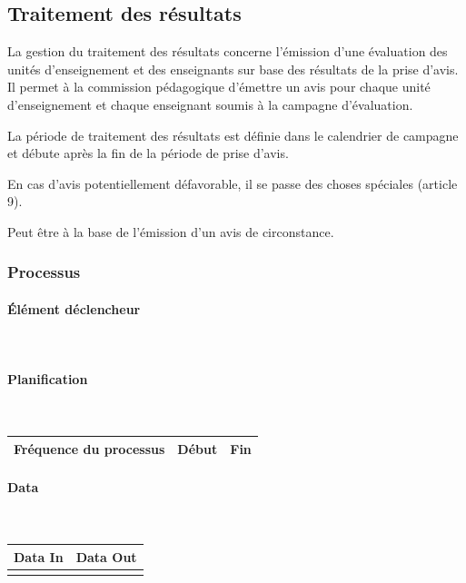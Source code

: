 \documentclass[a4paper,11pt]{report}
\begin{document}
\subsection{Traitement des résultats}
La gestion du traitement des résultats concerne l'émission d'une évaluation des unités d'enseignement et des enseignants sur base des résultats de la prise d'avis.
Il permet à la commission pédagogique d'émettre un avis pour chaque unité d'enseignement et chaque enseignant soumis à la campagne d'évaluation.

La période de traitement des résultats est définie dans le calendrier de campagne et débute après la fin de la période de prise d'avis.

En cas d'avis potentiellement défavorable, il se passe des choses spéciales (article 9).

Peut être à la base de l'émission d'un avis de circonstance.


\subsubsection{Processus}
\paragraph{Élément déclencheur}~\newline{}

\paragraph{Planification}~\newline{}

\begin{tabularx}{\linewidth}{|X|X|X|} \hline
Fréquence du processus & Début & Fin \\ \hline

\end{tabularx}

\paragraph{Data}~\newline{}

\begin{tabularx}{\linewidth}{|X|X|} \hline
Data In & Data Out \\ \hline
 & \\ \hline
\end{tabularx}
\end{document}
